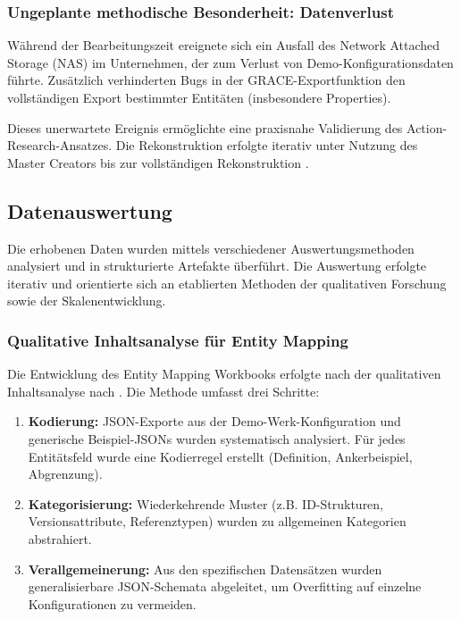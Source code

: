 \subsubsection{Ungeplante methodische Besonderheit: Datenverlust}
\label{subsubsec:NASCrashValidierung}

Während der Bearbeitungszeit ereignete sich ein Ausfall des Network Attached Storage (NAS) im Unternehmen, der zum Verlust von Demo-Konfigurationsdaten führte. Zusätzlich verhinderten Bugs in der GRACE-Exportfunktion den vollständigen Export bestimmter Entitäten (insbesondere Properties).

\noindent Dieses unerwartete Ereignis ermöglichte eine praxisnahe Validierung des Action-Research-Ansatzes. Die Rekonstruktion erfolgte iterativ unter Nutzung des Master Creators bis zur vollständigen Rekonstruktion \citep{grace:demo_werk_restored2026}.

\subsection{Datenauswertung}
\label{subsec:Datenauswertung}

Die erhobenen Daten wurden mittels verschiedener Auswertungsmethoden analysiert und in strukturierte Artefakte überführt. Die Auswertung erfolgte iterativ und orientierte sich an etablierten Methoden der qualitativen Forschung sowie der Skalenentwicklung.

\subsubsection{Qualitative Inhaltsanalyse für Entity Mapping}
\label{subsubsec:QualitativeInhaltsanalyse}

Die Entwicklung des Entity Mapping Workbooks erfolgte nach der qualitativen Inhaltsanalyse nach \cite{mayring:qualitative2015}. Die Methode umfasst drei Schritte:

\begin{enumerate}
    \item \textbf{Kodierung:} JSON-Exporte aus der Demo-Werk-Konfiguration \citep{grace:demo_werk_restored2026} und generische Beispiel-JSONs \citep{grace:jsons_example2025} wurden systematisch analysiert. Für jedes Entitätsfeld wurde eine Kodierregel erstellt (Definition, Ankerbeispiel, Abgrenzung).

    \item \textbf{Kategorisierung:} Wiederkehrende Muster (z.B. ID-Strukturen, Versionsattribute, Referenztypen) wurden zu allgemeinen Kategorien abstrahiert.

    \item \textbf{Verallgemeinerung:} Aus den spezifischen Datensätzen wurden generalisierbare JSON-Schemata abgeleitet, um Overfitting auf einzelne Konfigurationen zu vermeiden.
\end{enumerate}

